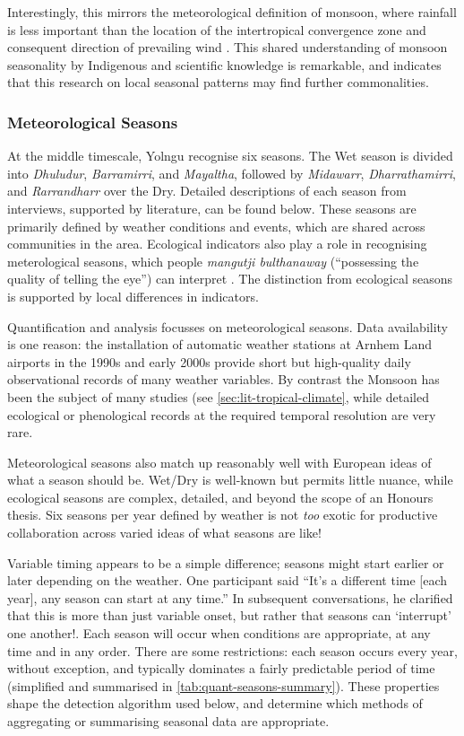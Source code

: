 Interestingly, this mirrors the meteorological definition of monsoon,
where rainfall is less important than the location of the intertropical
convergence zone and consequent direction of prevailing wind \citep[eg.][]{holland1985,cook2001}.
This shared understanding of monsoon seasonality by Indigenous and scientific
knowledge is remarkable, and indicates that this research on local seasonal
patterns may find further commonalities.


\subsubsection{Meteorological Seasons}

At the middle timescale, Yolngu recognise six seasons.
The Wet season is divided into \textit{Dhuludur}, \textit{Barramirri},
and \textit{Mayaltha}, followed by \textit{Midawarr}, \textit{Dharrathamirri},
and \textit{Rarrandharr} over the Dry.  Detailed descriptions of each
season from interviews, supported by literature, can be found below.
%
These seasons are primarily defined by weather conditions and events,
which are shared across communities in the area.  Ecological indicators
also play a role in recognising meterological seasons, which people
\textit{mangutji bulthanaway} (``possessing the quality of telling the eye'')
can interpret \citep[p35]{atlas2014}.  The distinction from ecological
seasons is supported by local differences in indicators.

Quantification and analysis focusses on meteorological seasons.
Data availability is one reason:  the installation of automatic weather
stations at Arnhem Land airports in the 1990s and early 2000s provide
short but high-quality daily observational records of many weather variables.
By contrast the Monsoon has been the subject of many studies (see \cref{sec:lit-tropical-climate}, while
detailed ecological or phenological records at the required temporal
resolution are very rare.

Meteorological seasons also match up reasonably well with European ideas
of what a season should be.  Wet/Dry is well-known but permits little nuance,
while ecological seasons are complex, detailed, and beyond the scope of an Honours
thesis.  Six seasons per year defined by weather is not \emph{too} exotic
for productive collaboration across varied ideas of what seasons are like!

Variable timing appears to be a simple difference; seasons might start
earlier or later depending on the weather.  One participant said
``It's a different time [each year], any season can start at any time.''
In subsequent conversations, he clarified that this is more than just
variable onset, but rather that seasons can `interrupt' one another!.  Each season will
occur when conditions are appropriate, at any time and in any order.
%
There are some restrictions: each season occurs every year,
without exception, and typically dominates a fairly predictable period
of time (simplified and summarised in \cref{tab:quant-seasons-summary}).
These properties shape the detection algorithm used below, and determine
which methods of aggregating or summarising seasonal data are appropriate.



